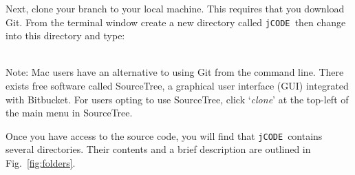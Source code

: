 \documentclass[12pt]{article}
\newcommand{\code}[1]{\texttt{#1}}
\newcommand{\jcode}{\code{jCODE}~}
\newcommand{\rootdir}{\code{\MakeLowercase{\jcode}}}
\begin{document}
Next, clone your branch to your local machine. This requires that you download Git. From the terminal window create a new directory called \rootdir then change into this directory and type:

\vspace{1em}
\vspace{1em}\\
Note: Mac users have an alternative to using Git from the command line. There exists free software called SourceTree, a graphical user interface (GUI) integrated with Bitbucket. For users opting to use SourceTree, click `\textit{clone}' at the top-left of the main menu in SourceTree. 

Once you have access to the source code, you will find that \jcode contains several directories. Their contents and a brief description are outlined in Fig.~\ref{fig:folders}.
\end{document}

